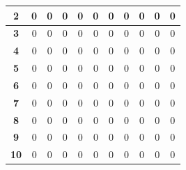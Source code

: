 \documentclass[a4paper,14pt]{extarticle}
\begin{document}
\begin{enumerate}[label=1.\arabic*.]
\begin{enumerate}[1) ]
\begin{tabular}{|c|c|c|c|c|c|c|c|c|c|c|}
			            \hline\textbf{2}  & 0          & 0          & 0          & 0          & 0          & 0          & 0          & 0          & 0          & 0           \\
			            \hline\textbf{3}  & 0          & 0          & 0          & 0          & 0          & 0          & 0          & 0          & 0          & 0           \\
			            \hline\textbf{4}  & 0          & 0          & 0          & 0          & 0          & 0          & 0          & 0          & 0          & 0           \\
			            \hline\textbf{5}  & 0          & 0          & 0          & 0          & 0          & 0          & 0          & 0          & 0          & 0           \\
			            \hline\textbf{6}  & 0          & 0          & 0          & 0          & 0          & 0          & 0          & 0          & 0          & 0           \\
			            \hline\textbf{7}  & 0          & 0          & 0          & 0          & 0          & 0          & 0          & 0          & 0          & 0           \\
			            \hline\textbf{8}  & 0          & 0          & 0          & 0          & 0          & 0          & 0          & 0          & 0          & 0           \\
			            \hline\textbf{9}  & 0          & 0          & 0          & 0          & 0          & 0          & 0          & 0          & 0          & 0           \\
			            \hline\textbf{10} & 0          & 0          & 0          & 0          & 0          & 0          & 0          & 0          & 0          & 0           \\
			            \hline
		            \end{tabular}


\end{enumerate}
\end{enumerate}
\end{document}
